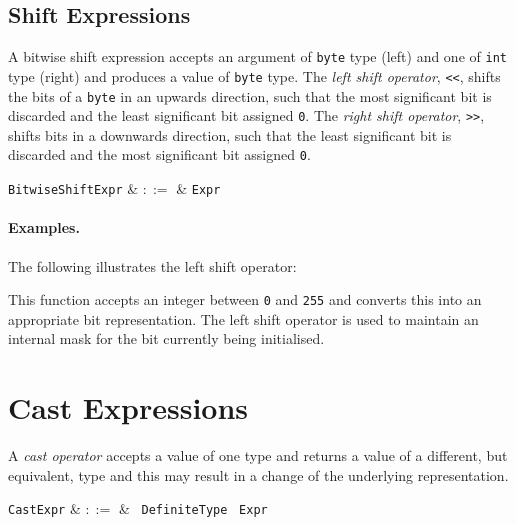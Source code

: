 \subsection{Shift Expressions}
\label{c_expr_shift}

A bitwise shift expression accepts an argument of \lstinline{byte} type (left) and one of \lstinline{int} type (right) and produces a value of \lstinline{byte} type.  The {\em left shift operator}, \lstinline{<<}, shifts the bits of a \lstinline{byte} in an upwards direction, such that the most significant bit is discarded and the least significant bit assigned \lstinline{0}.  The {\em right shift operator}, \lstinline{>>}, shifts bits in a downwards direction, such that the least significant bit is discarded and the most significant bit assigned \lstinline{0}.  

\begin{syntax}
  \verb+BitwiseShiftExpr+ & $::=$ & \verb+Expr+\ 
\end{syntax}

\paragraph{Examples.} The following illustrates the left shift operator:



This function accepts an integer between \lstinline{0} and \lstinline{255} and converts this into an appropriate bit representation.  The left shift operator is used to maintain an internal mask for the bit currently being initialised.


\section{Cast Expressions}
\label{c_expr_cast}
A {\em cast operator} accepts a value of one type and returns a value of a different, but equivalent, type and this may result in a change of the underlying representation.  

\begin{syntax}
\verb+CastExpr+ & $::=$ & \token{(}\ \verb+DefiniteType+ \token{)}\ \verb+Expr+\\
\end{syntax}


